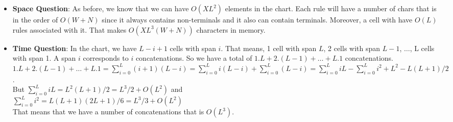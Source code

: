 \documentclass{article}
\begin{document}
\begin{spacing}{1.1}
\begin{itemize}
\begin{itemize}
	\end{itemize}
	\item {\bf Space Question}: As before, we know that we can have $O(XL^2)$ elements in the chart. Each rule will have a number of chars that is in the order of $O(W+N)$ since it always contains non-terminals and it also can contain terminals. Moreover, a cell with have $O(L)$ rules associated with it. That makes $O(XL^3(W+N))$ characters in memory. 
	\item {\bf Time Question}: In the chart, we have $L-i+1$ cells with span $i$. That means, 1 cell with span $L$, 2 cells with span $L-1$, $\dots$, L cells with span 1. A span $i$ corresponds to $i$ concatenations. So we have a total of $1.L + 2.(L-1) + \dots + L.1$ concatenations. \\
$1.L + 2.(L-1) + \dots + L.1 = \sum_{i=0}^{L} (i+1)(L-i) = \sum_{i=0}^{L} i(L-i) + \sum_{i=0}^{L} (L-i) = \sum_{i=0}^{L} iL - \sum_{i=0}^{L} i^2 + L^2 - L(L+1)/2$.\\
But $ \sum_{i=0}^{L} iL = L^2(L+1)/2 = L^3/2 + O(L^2)$ and\\
$ \sum_{i=0}^{L} i^2 = L(L+1)(2L+1)/6 = L^3/3 + O(L^2)$\\
That means that we have a number of concatenations that is $O(L^3)$.
\end{itemize}


\end{spacing}
\end{document}
